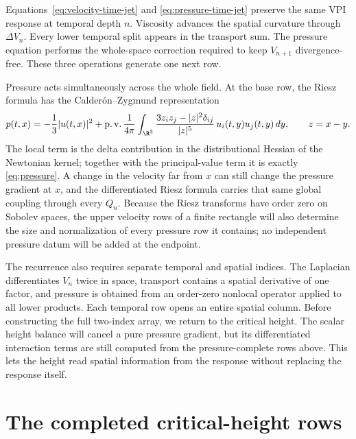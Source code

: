 Equations~\eqref{eq:velocity-time-jet} and
\eqref{eq:pressure-time-jet} preserve the same VPI response at temporal depth
\(n\).  Viscosity
advances the spatial curvature through \(\Delta V_n\).  Every lower temporal
split appears in the transport sum.  The pressure equation performs the
whole-space correction required to keep \(V_{n+1}\) divergence-free.  These
three operations generate one next row.

Pressure acts simultaneously across the whole field.  At the base row, the
Riesz formula has the Calder\'on--Zygmund representation
\begin{equation*}
 p(t,x)=-\frac13|u(t,x)|^2
 +\operatorname{p.v.}\frac1{4\pi}\int_{\R^3}
 \frac{3z_i z_j-|z|^2\delta_{ij}}{|z|^5}\,
 u_i(t,y)u_j(t,y)\,dy,
 \qquad z=x-y.
\end{equation*}
The local term is the delta contribution in the distributional Hessian of the
Newtonian kernel; together with the principal-value term it is exactly
\eqref{eq:pressure}.  A change in the velocity far from \(x\) can still change
the pressure gradient at \(x\), and the differentiated Riesz formula carries
that same global coupling through every \(Q_n\).  Because the Riesz transforms
have order zero on Sobolev spaces, the upper velocity rows of a finite
rectangle will also determine the size and normalization of every pressure row
it contains; no independent pressure datum will be added at the endpoint.

The recurrence also requires separate temporal and spatial indices.  The
Laplacian differentiates \(V_n\) twice in space, transport
contains a spatial derivative of one factor, and pressure is obtained from an
order-zero nonlocal operator applied to all lower products.  Each temporal row
opens an entire spatial column.  Before constructing the full two-index array,
we return to the critical height.  The scalar height balance will cancel a pure
pressure gradient, but its differentiated interaction terms are still computed
from the pressure-complete rows above.  This lets the height read spatial
information from the response without replacing the response itself.

\section{The completed critical-height rows}

